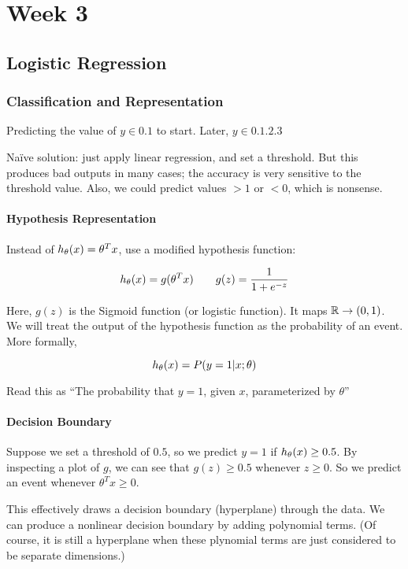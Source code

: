 \chapter{Week 3}

\section{Logistic Regression}

\subsection{Classification and Representation}

Predicting the value of $y \in \qty{0, 1}$ to start.  Later, $y \in \qty{0, 1, 2, 3}$

Na\"ive solution: just apply linear regression, and set a threshold.
But this produces bad outputs in many cases; the accuracy is very sensitive to the threshold value.
Also, we could predict values $>1$ or $<0$, which is nonsense.

\subsubsection{Hypothesis Representation}

Instead of $h_\theta(x) = \theta^T x$, use a modified hypothesis function:

\[ h_\theta(x) = g(\theta^T x) \qquad g(z) = \frac{1}{1 + e^{-z}} \]

Here, $g(z)$ is the Sigmoid function (or logistic function).  It maps $\mathbb{R} \to (0,1)$.
We will treat the output of the hypothesis function as the probability of an event.
More formally,

\[ h_\theta(x) = P(y=1 | x ; \theta) \]

Read this as ``The probability that $y=1$, given $x$, parameterized by $\theta$''

\subsubsection{Decision Boundary}

Suppose we set a threshold of $0.5$, so we predict $y=1$ if $h_\theta(x) \geq 0.5$.
By inspecting a plot of $g$, we can see that $g(z) \geq 0.5$ whenever $z \geq 0$.
So we predict an event whenever $\theta^T x \geq 0$.

This effectively draws a decision boundary (hyperplane) through the data.
We can produce a nonlinear decision boundary by adding polynomial terms.
(Of course, it is still a hyperplane when these plynomial terms are just
considered to be separate dimensions.)

